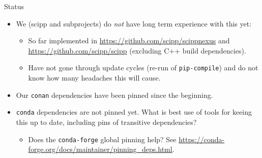 \documentclass[english,aspectratio=1610,smaller]{beamer}
\begin{document}
\begin{frame}{Status}
  \begin{itemize}
    \item We (scipp and subprojects) do \emph{not} have long term experience with this yet:
      \begin{itemize}
        \item So far implemented in \url{https://github.com/scipp/scippnexus} and \url{https://github.com/scipp/scipp} (excluding C++ build dependencies).
        \item Have not gone through update cycles (re-run of \texttt{pip-compile}) and do not know how many headaches this will cause.
      \end{itemize}
    \item Our \texttt{conan} dependencies have been pinned since the beginning.
    \item \texttt{conda} dependencies are not pinned yet.
      What is best use of tools for keeing this up to date, including pins of transitive dependencies?
      \begin{itemize}
        \item Does the \texttt{conda-forge} global pinning help?
          See \url{https://conda-forge.org/docs/maintainer/pinning_deps.html}.
      \end{itemize}
  \end{itemize}
\end{frame}
\end{document}
